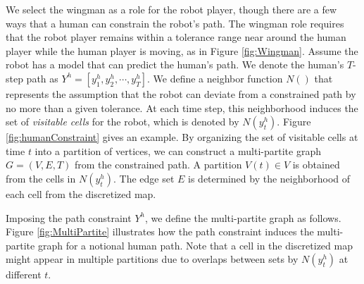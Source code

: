 \documentclass[phd]{byuprop}
\begin{document}
We select the wingman as a role for the robot player, though there are a few ways that a human can constrain the robot's path.
The wingman role requires that the robot player remains within a tolerance range near around the human player while the human player is moving, as in Figure \ref{fig:Wingman}.
Assume the robot has a model that can predict the human's path.
We denote the human's $T$-step path as $ Y^{h} = [y^{h}_{1}, y^{h}_{2} , \cdots , y^{h}_{T}] $.
We define a neighbor function $ N () $ that represents the assumption that the robot can deviate from a constrained path by no more than a given tolerance.  
At each time step, this neighborhood induces the set of {\em visitable cells} for the robot, which is denoted by $ N( y^{h}_{t} ) $.
Figure \ref{fig:humanConstraint} gives an example.
By organizing the set of visitable cells at time $ t $ into a partition of vertices, we can construct a multi-partite graph $ G = (V, E, T) $ from the constrained path.
A partition $ V(t) \in V $ is obtained from the cells in $ N( y^{h}_{t} ) $.
The edge set $ E $ is determined by the neighborhood of each cell from the discretized map.

Imposing the path constraint $ Y^{h} $, we define the multi-partite graph as follows.
Figure \ref{fig:MultiPartite} illustrates how the path constraint induces the multi-partite graph for a notional human path.
Note that a cell in the discretized map might appear in multiple partitions due to overlaps between sets by $ N( y^{h}_{t} ) $ at different $ t $.
\end{document}
